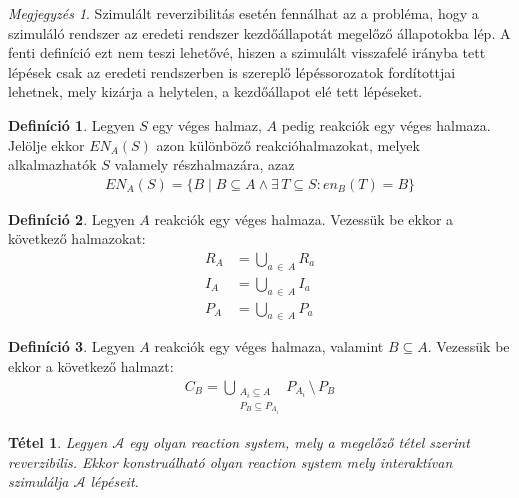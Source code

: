 \documentclass[12pt]{article}
\theoremstyle{definition}
\newtheorem*{definition*}{Definíció}
\theoremstyle{remark}
\newtheorem*{remark*}{Megjegyzés}
\theoremstyle{plain}
\newtheorem*{theorem*}{Tétel}
\theoremstyle{plain}
\newcommand{\en}{\textit{en}}
\begin{document}
    \begin{remark*}
        Szimulált reverzibilitás esetén fennálhat az a probléma, hogy a szimuláló rendszer az eredeti rendszer kezdőállapotát megelőző állapotokba lép. A fenti definíció ezt nem teszi lehetővé, hiszen a szimulált visszafelé irányba tett lépések csak az eredeti rendszerben is szereplő lépéssorozatok fordítottjai lehetnek, mely kizárja a helytelen, a kezdőállapot elé tett lépéseket.
    \end{remark*}

    \begin{definition*}
        Legyen $S$ egy véges halmaz, $A$ pedig reakciók egy véges halmaza. Jelölje ekkor $\textit{EN}_{A}(S)$ azon különböző reakcióhalmazokat, melyek alkalmazhatók $S$ valamely részhalmazára, azaz
        \begin{align*}
            \textit{EN}_{A}(S) = \{ B \;|\; B \subseteq A \wedge \exists\,T \subseteq S : \en_{B}(T) = B \}
        \end{align*}
    \end{definition*}

    \begin{definition*}
        Legyen $A$ reakciók egy véges halmaza. Vezessük be ekkor a következő halmazokat:
        \begin{align*}
            R_{A} &= \bigcup\limits_{a \,\in\, A} R_{a} \\
            I_{A} &= \bigcup\limits_{a \,\in\, A} I_{a} \\
            P_{A} &= \bigcup\limits_{a \,\in\, A} P_{a}
        \end{align*}
    \end{definition*}

    \begin{definition*}
        Legyen $A$ reakciók egy véges halmaza, valamint $B \subseteq A$. Vezessük be ekkor a következő halmazt:
        \begin{align*}
            C_{B} = \bigcup\limits_{\substack{A_{i} \subseteq A \\ P_{B} \subseteq P_{A_{i}}}} P_{A_{i}} \,\setminus\, P_{B}
        \end{align*}
    \end{definition*}

    \begin{theorem*}
        Legyen $\mathscr{A}$ egy olyan \textit{reaction system}, mely a megelőző tétel szerint reverzibilis. Ekkor konstruálható olyan \textit{reaction system} mely interaktívan szimulálja $\mathscr{A}$ lépéseit.
    \end{theorem*}
\end{document}
